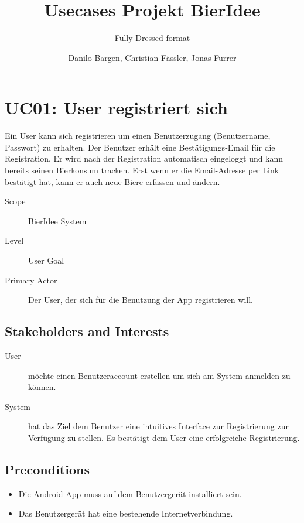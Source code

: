 \documentclass[10pt,a4paper]{scrartcl}
\author{Danilo Bargen, Christian Fässler, Jonas Furrer}
\title{Usecases Projekt BierIdee}
\subtitle{Fully Dressed format}
\begin{document}
\begin{titlepage}
	\maketitle
	\vspace{120mm}
	\thispagestyle{empty} %
\end{titlepage}



\section*{UC01: User registriert sich }

Ein User kann sich registrieren um einen Benutzerzugang (Benutzername, Passwort) zu erhalten. Der Benutzer erhält eine Bestätigungs-Email für die Registration. Er wird nach der Registration automatisch eingeloggt und kann bereits seinen Bierkonsum tracken. Erst wenn er die Email-Adresse per Link bestätigt hat, kann er auch neue Biere erfassen und ändern.


\begin{description}
\item[Scope] BierIdee System
\item[Level] User Goal
\item[Primary Actor] Der User, der sich für die Benutzung der App registrieren will.
\end{description}


\subsection*{Stakeholders and Interests}

\begin{description}
\item[User] möchte einen Benutzeraccount erstellen um sich am System anmelden zu können.
\item[System] hat das Ziel dem Benutzer eine intuitives Interface zur Registrierung zur Verfügung zu stellen. Es bestätigt dem User eine erfolgreiche Registrierung.
\end{description}


\subsection*{Preconditions}

\begin{itemize}
\item Die Android App muss auf dem Benutzergerät installiert sein.
\item Das Benutzergerät hat eine bestehende Internetverbindung.
\end{itemize}
\end{document}
